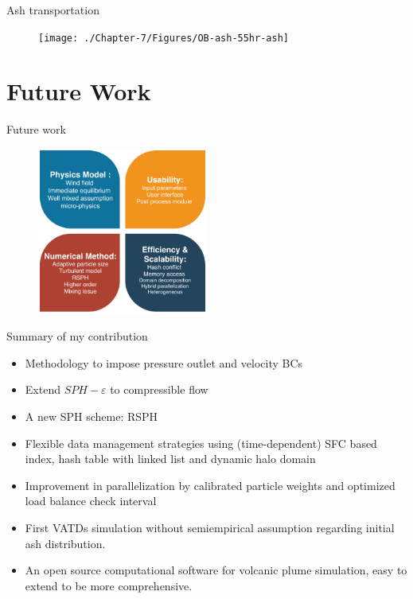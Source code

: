 \documentclass{beamer}
\begin{document}
\begin{frame}{Ash transportation}
\begin{figure}[!htb]
\begin{minipage}{.288\textwidth}
    \end{minipage}%
    \begin{minipage}{.288\textwidth}
        \centering
        \texttt{[image: ./Chapter-7/Figures/OB-ash-55hr-ash]}
    \end{minipage}%
\end{figure}
\end{frame}
\section{Future Work}
\begin{frame} {Future work}
\begin{figure}
	\includegraphics[width=0.5\textwidth]{./PPT/Future-Work}
\end{figure}
\end{frame}
%
\begin{frame} {Summary of my contribution}
\begin{itemize}
\item Methodology to impose pressure outlet and velocity BCs
\item Extend $SPH-\varepsilon$ to compressible flow
\item A new SPH scheme: RSPH
\item Flexible data management strategies using (time-dependent) SFC based index, hash table with linked list and dynamic halo domain
\item Improvement in parallelization by calibrated particle weights and optimized load balance check interval 
\item First VATDs simulation without semiempirical assumption regarding initial ash distribution.
\item An open source computational software for volcanic plume simulation, easy to extend to be more comprehensive.
\end{itemize}
\end{frame}
\end{document}
